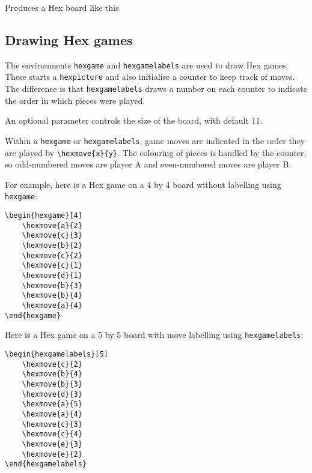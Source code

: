 \documentclass[a4paper,12pt]{article}
\begin{document}
    Produces a Hex board like this\\
    
    \begin{hexpicture}
    \end{hexpicture}

    \subsection{Drawing Hex games}
    
    The environments \verb|hexgame| and \verb|hexgamelabels| are used to draw Hex games. These starts a \verb|hexpicture| and also initialise a counter to keep track of moves. The difference is that \verb|hexgamelabels| draws a number on each counter to indicate the order in which pieces were played. 
    
    An optional parameter controls the size of the board, with default 11. 
    
    Within a \verb|hexgame| or \verb|hexgamelabels|, game moves are indicated in the order they are played by \verb|\hexmove{x}{y}|. The colouring of pieces is handled by the counter, so odd-numbered moves are player A and even-numbered moves are player B.
    
    For example, here is a Hex game on a 4 by 4 board without labelling using \verb|hexgame|:
    
    \begin{verbatim}\begin{hexgame}[4]
    \hexmove{a}{2}
    \hexmove{c}{3}
    \hexmove{b}{2}
    \hexmove{c}{2}
    \hexmove{c}{1}
    \hexmove{d}{1}
    \hexmove{b}{3}
    \hexmove{b}{4}
    \hexmove{a}{4}
\end{hexgame}\end{verbatim}
    
    \begin{hexgame}[4]
    \end{hexgame}
    
    Here is a Hex game on a 5 by 5 board with move labelling using \verb|hexgamelabels|:
    
    \begin{verbatim}\begin{hexgamelabels}[5]
    \hexmove{c}{2}
    \hexmove{b}{4}
    \hexmove{b}{3}
    \hexmove{d}{3}
    \hexmove{a}{5}
    \hexmove{a}{4}
    \hexmove{c}{3}
    \hexmove{c}{4}
    \hexmove{e}{3}
    \hexmove{e}{2}
\end{hexgamelabels}\end{verbatim}
    
\end{document}
